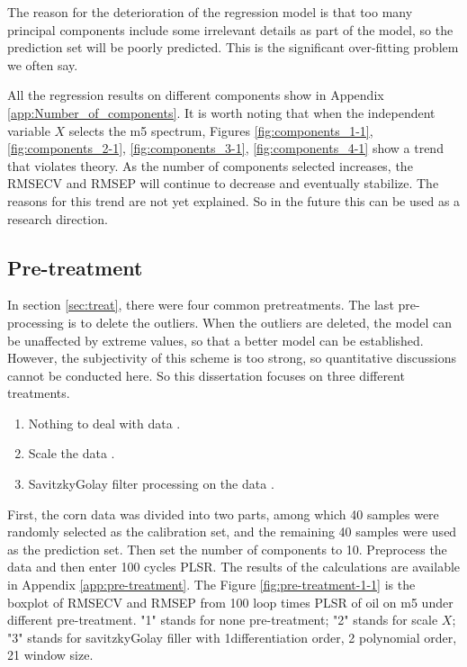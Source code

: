 \documentclass[a4paper,12pt,titlepage]{article} %
\numberwithin{equation}{section}  %
\begin{document}
	The reason for the deterioration of the regression model is that too many principal components include some irrelevant details as part of the model, so the prediction set will be poorly predicted. This is the significant over-fitting problem we often say.
	
	All the regression results on different components show in Appendix \ref{app:Number_of_components}.
	It is worth noting that when the independent variable $X$ selects the m5 spectrum, Figures \ref{fig:components_1-1}, \ref{fig:components_2-1}, \ref{fig:components_3-1}, \ref{fig:components_4-1} show a trend that violates theory. As the number of components selected increases, the RMSECV and RMSEP  will continue to decrease and eventually stabilize. The reasons for this trend are not yet explained. So in the future this can be used as a research direction.
	
	\subsection{Pre-treatment}
	\label{sec:Pre-treatment}
	
	In section \ref{sec:treat}, there were four common pretreatments. The last pre-processing is to delete the outliers. When the outliers are deleted, the model can be unaffected by extreme values, so that a better model can be established. However, the subjectivity of this scheme is too strong, so quantitative discussions cannot be conducted here. So this dissertation focuses on three different treatments.
	\begin{enumerate}
	\item Nothing to deal with data \citep{1su2006partial}.
	
	\item Scale the data \citep{4ergon2006reduced}.
	
	\item SavitzkyGolay filter processing on the data \citep{3galvao2007cross}.
	
\end{enumerate}

First, the corn data was divided into two parts, among which 40 samples were randomly selected as the calibration set, and the remaining 40 samples were used as the prediction set. Then set the number of components to 10. Preprocess the data and then enter 100 cycles PLSR. The results of the calculations are available in Appendix \ref{app:pre-treatment}. The Figure \ref{fig:pre-treatment-1-1} is the boxplot of RMSECV and RMSEP from 100 loop times PLSR  of oil on m5 under different pre-treatment. "1" stands for none pre-treatment; "2" stands for scale $X$; "3" stands for savitzkyGolay filler with 1differentiation order, 2 polynomial order, 21 window size.
	
\end{document}
